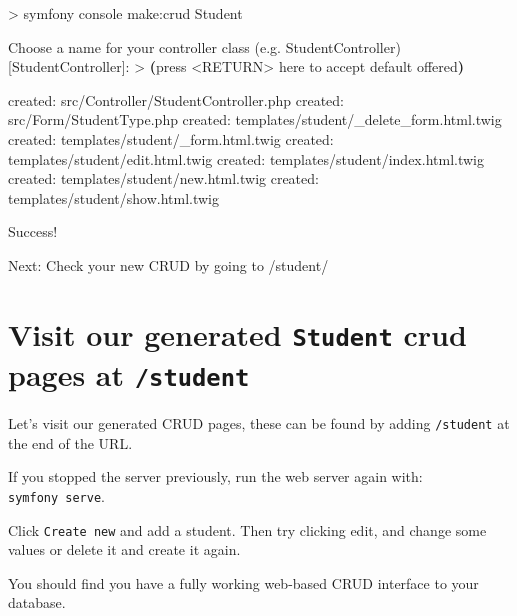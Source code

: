 \documentclass[a4paperpaper,openright]{book}
\newenvironment{Shaded}{}{}
\newcommand{\ExtensionTok}[1]{#1}
\newcommand{\KeywordTok}[1]{\textcolor[rgb]{0.00,0.44,0.13}{\textbf{#1}}}
\newcommand{\NormalTok}[1]{#1}
\newcommand{\OperatorTok}[1]{\textcolor[rgb]{0.40,0.40,0.40}{#1}}
\begin{document}
\begin{Shaded}
\begin{Highlighting}[]
    \OperatorTok{>} \ExtensionTok{symfony}\NormalTok{ console make:crud Student}
    
      \ExtensionTok{Choose}\NormalTok{ a name for your controller class (e.g. StudentController) [}\ExtensionTok{StudentController}\NormalTok{]:}
       \OperatorTok{>}               \KeywordTok{(}\ExtensionTok{press} \OperatorTok{<}\NormalTok{RETURN}\OperatorTok{>}\NormalTok{ here to accept default offered}\KeywordTok{)}

     \ExtensionTok{created}\NormalTok{: src/Controller/StudentController.php}
     \ExtensionTok{created}\NormalTok{: src/Form/StudentType.php}
     \ExtensionTok{created}\NormalTok{: templates/student/_delete_form.html.twig}
     \ExtensionTok{created}\NormalTok{: templates/student/_form.html.twig}
     \ExtensionTok{created}\NormalTok{: templates/student/edit.html.twig}
     \ExtensionTok{created}\NormalTok{: templates/student/index.html.twig}
     \ExtensionTok{created}\NormalTok{: templates/student/new.html.twig}
     \ExtensionTok{created}\NormalTok{: templates/student/show.html.twig}
               
      \ExtensionTok{Success}\NormalTok{! }

     \ExtensionTok{Next}\NormalTok{: Check your new CRUD by going to /student/}
\end{Highlighting}
\end{Shaded}

\hypertarget{visit-our-generated-student-crud-pages-at-student}{%
\section{\texorpdfstring{Visit our generated \texttt{Student} crud pages
at
\texttt{/student}}{Visit our generated Student crud pages at /student}}\label{visit-our-generated-student-crud-pages-at-student}}

Let's visit our generated CRUD pages, these can be found by adding
\texttt{/student} at the end of the URL.

If you stopped the server previously, run the web server again with:
\texttt{symfony\ serve}.

Click \texttt{Create\ new} and add a student. Then try clicking edit,
and change some values or delete it and create it again.

You should find you have a fully working web-based CRUD interface to
your database.
\end{document}
